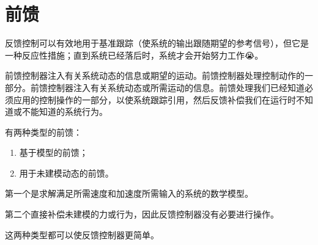 \section{前馈}
反馈控制可以有效地用于基准跟踪（使系统的输出跟随期望的参考信号），但它是一种反应性措施；直到系统已经落后时，系统才会开始努力工作😭。

前馈控制器注入有关系统动态的信息或期望的运动。前馈控制器处理控制动作的一部分。前馈控制器注入有关系统动态或所需运动的信息。前馈处理我们已经知道必须应用的控制操作的一部分，以使系统跟踪引用，然后反馈补偿我们在运行时不知道或不能知道的系统行为。

有两种类型的前馈：
\begin{enumerate}
	\item 基于模型的前馈；
	\item 用于未建模动态的前馈。
\end{enumerate}
第一个是求解满足所需速度和加速度所需输入的系统的数学模型。

第二个直接补偿未建模的力或行为，因此反馈控制器没有必要进行操作。

这两种类型都可以使反馈控制器更简单。
